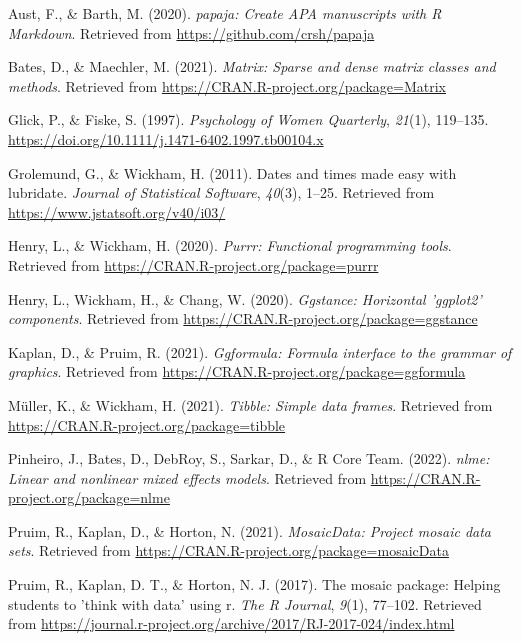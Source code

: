 \documentclass[
  english,
  man]{apa6}
\begin{document}
\begingroup
\setlength{\parindent}{-0.5in}
\setlength{\leftskip}{0.5in}

\hypertarget{refs}{}
\leavevmode\hypertarget{ref-R-papaja}{}%
Aust, F., \& Barth, M. (2020). \emph{papaja: Create APA manuscripts with R Markdown}. Retrieved from \url{https://github.com/crsh/papaja}

\leavevmode\hypertarget{ref-R-Matrix}{}%
Bates, D., \& Maechler, M. (2021). \emph{Matrix: Sparse and dense matrix classes and methods}. Retrieved from \url{https://CRAN.R-project.org/package=Matrix}

\leavevmode\hypertarget{ref-ASI}{}%
Glick, P., \& Fiske, S. (1997). \emph{Psychology of Women Quarterly}, \emph{21}(1), 119--135. \url{https://doi.org/10.1111/j.1471-6402.1997.tb00104.x}

\leavevmode\hypertarget{ref-R-lubridate}{}%
Grolemund, G., \& Wickham, H. (2011). Dates and times made easy with lubridate. \emph{Journal of Statistical Software}, \emph{40}(3), 1--25. Retrieved from \url{https://www.jstatsoft.org/v40/i03/}

\leavevmode\hypertarget{ref-R-purrr}{}%
Henry, L., \& Wickham, H. (2020). \emph{Purrr: Functional programming tools}. Retrieved from \url{https://CRAN.R-project.org/package=purrr}

\leavevmode\hypertarget{ref-R-ggstance}{}%
Henry, L., Wickham, H., \& Chang, W. (2020). \emph{Ggstance: Horizontal 'ggplot2' components}. Retrieved from \url{https://CRAN.R-project.org/package=ggstance}

\leavevmode\hypertarget{ref-R-ggformula}{}%
Kaplan, D., \& Pruim, R. (2021). \emph{Ggformula: Formula interface to the grammar of graphics}. Retrieved from \url{https://CRAN.R-project.org/package=ggformula}

\leavevmode\hypertarget{ref-R-tibble}{}%
Müller, K., \& Wickham, H. (2021). \emph{Tibble: Simple data frames}. Retrieved from \url{https://CRAN.R-project.org/package=tibble}

\leavevmode\hypertarget{ref-R-nlme}{}%
Pinheiro, J., Bates, D., DebRoy, S., Sarkar, D., \& R Core Team. (2022). \emph{nlme: Linear and nonlinear mixed effects models}. Retrieved from \url{https://CRAN.R-project.org/package=nlme}

\leavevmode\hypertarget{ref-R-mosaicData}{}%
Pruim, R., Kaplan, D., \& Horton, N. (2021). \emph{MosaicData: Project mosaic data sets}. Retrieved from \url{https://CRAN.R-project.org/package=mosaicData}

\leavevmode\hypertarget{ref-R-mosaic}{}%
Pruim, R., Kaplan, D. T., \& Horton, N. J. (2017). The mosaic package: Helping students to 'think with data' using r. \emph{The R Journal}, \emph{9}(1), 77--102. Retrieved from \url{https://journal.r-project.org/archive/2017/RJ-2017-024/index.html}
\end{document}
